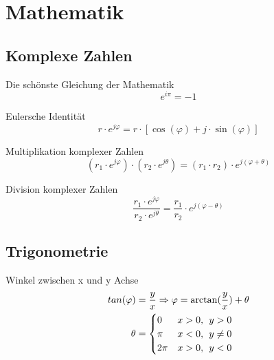 \documentclass[11pt, a4paper, draft, fleqn, twocolumn]{article}
\numberwithin{equation}{subsection}
\begin{document}



\section{Mathematik}

\subsection{Komplexe Zahlen}

Die schönste Gleichung der Mathematik
\begin{equation}
    e^{i\pi} = -1
\end{equation}

\noindent Eulersche Identität
\begin{equation}
    r \cdot e^{j\varphi} = r \cdot [\cos(\varphi) + j \cdot \sin(\varphi)]
\end{equation}

\noindent Multiplikation komplexer Zahlen
\begin{equation}
    (r_1 \cdot e^{j\varphi}) \cdot (r_2 \cdot e^{j\theta}) = (r_1 \cdot r_2) \cdot e^{j(\varphi + \theta)}
\end{equation}

\noindent Division komplexer Zahlen
\begin{equation}
    \frac{r_1 \cdot e^{j\varphi}}{r_2 \cdot e^{j\theta}} = \frac{r_1}{r_2} \cdot e^{j(\varphi - \theta)}
\end{equation}


\subsection{Trigonometrie}

Winkel zwischen x und y Achse
\begin{equation}
\begin{split}
    tan(\varphi) & = \frac{y}{x} \Rightarrow \varphi = \arctan(\frac{y}{x})+\theta \\
    \theta & = 
    \begin{cases}
        0 & x > 0, \hspace{1ex} y > 0 \\
        \pi & x < 0, \hspace{1ex} y \neq  0 \\
        2\pi & x > 0, \hspace{1ex} y < 0
    \end{cases}
\end{split}
\end{equation}
\end{document}
